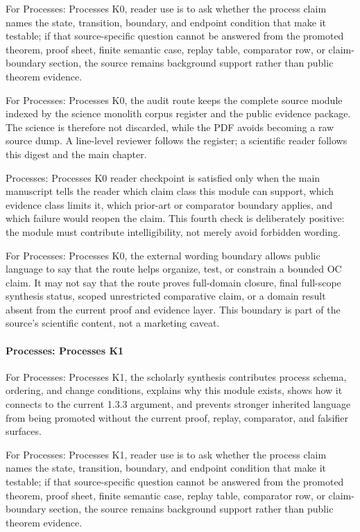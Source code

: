 For Processes: Processes K0, reader use is to ask whether the process claim names the state, transition, boundary, and endpoint condition that make it testable; if that source-specific question cannot be answered from the promoted theorem, proof sheet, finite semantic case, replay table, comparator row, or claim-boundary section, the source remains background support rather than public theorem evidence.


For Processes: Processes K0, the audit route keeps the complete source module indexed by the science monolith corpus register and the public evidence package. The science is therefore not discarded, while the PDF avoids becoming a raw source dump. A line-level reviewer follows the register; a scientific reader follows this digest and the main chapter.


Processes: Processes K0 reader checkpoint is satisfied only when the main manuscript tells the reader which claim class this module can support, which evidence class limits it, which prior-art or comparator boundary applies, and which failure would reopen the claim. This fourth check is deliberately positive: the module must contribute intelligibility, not merely avoid forbidden wording.


For Processes: Processes K0, the external wording boundary allows public language to say that the route helps organize, test, or constrain a bounded OC claim. It may not say that the route proves full-domain closure, final full-scope synthesis status, scoped unrestricted comparative claim, or a domain result absent from the current proof and evidence layer. This boundary is part of the source's scientific content, not a marketing caveat.


\paragraph{Processes: Processes K1}

For Processes: Processes K1, the scholarly synthesis contributes process schema, ordering, and change conditions, explains why this module exists, shows how it connects to the current 1.3.3 argument, and prevents stronger inherited language from being promoted without the current proof, replay, comparator, and falsifier surfaces.


For Processes: Processes K1, reader use is to ask whether the process claim names the state, transition, boundary, and endpoint condition that make it testable; if that source-specific question cannot be answered from the promoted theorem, proof sheet, finite semantic case, replay table, comparator row, or claim-boundary section, the source remains background support rather than public theorem evidence.


